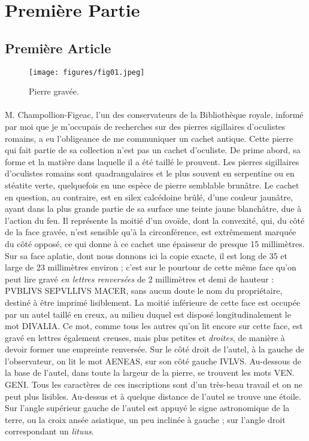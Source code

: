 \documentclass[a4paper, 11pt, oneside, polutonikogreek, french]{article}
\begin{document}
\section{Première Partie}
\subsection{Première Article}
\begin{figure}[H]
\centering
\texttt{[image: figures/fig01.jpeg]}
\caption{Pierre gravée.}
\end{figure}
\paragraph{}
M. Champollion-Figeac, l'un des conservateurs de la Bibliothèque royale, informé par moi que je m'occupais de recherches sur des pierres sigillaires d'oculistes romains, a eu l'obligeance de me communiquer un cachet antique. Cette pierre qui fait partie de sa collection n'est pas un cachet d'oculiste. De prime abord, sa forme et la matière dans laquelle il a été taillé le prouvent. Les pierres sigillaires d'oculistes romains sont quadrangulaires et le plus souvent en serpentine ou en stéatite verte, quelquefois en une espèce de pierre semblable brunâtre. Le cachet en question, au contraire, est en silex calcédoine brûlé, d'une couleur jaunâtre, ayant dans la plus grande partie de sa surface une teinte jaune blanchâtre, due à l'action du feu. Il représente la moitié d'un ovoïde, dont la convexité, qui, du côté de la face gravée, n'est sensible qu'à la circonférence, est extrêmement marquée du côté opposé, ce qui donne à ce cachet une épaisseur de presque 15 millimètres. Sur sa face aplatie, dont nous donnons ici la copie exacte, il est long de 35 et large de 23 millimètres environ ; c'est sur le pourtour de cette même face qu'on peut lire gravé \emph{en lettres renversées} de 2 millimètres et demi de hauteur : PVBLIVS SEPVLLIVS MACER, sans aucun doute le nom du propriétaire, destiné à être imprimé lisiblement. La moitié inférieure de cette face est occupée par un autel taillé en creux, au milieu duquel est disposé longitudinalement le mot DIVALIA. Ce mot, comme tous les autres qu'on lit encore sur cette face, est gravé en lettres également creuses, mais plus petites et \emph{droites}, de manière à devoir former une empreinte renversée. Sur le côté droit de l'autel, à la gauche de l'observateur, on lit le mot AENEAS, sur son côté gauche IVLVS. Au-dessous de la base de l'autel, dans toute la largeur de la pierre, se trouvent les mots VEN. GENI. Tous les caractères de ces inscriptions sont d'un très-beau travail et on ne peut plus lisibles. Au-dessus et à quelque distance de l'autel se trouve une étoile. Sur l'angle supérieur gauche de l'autel est appuyé le signe astronomique de la terre, ou la croix ansée asiatique, un peu inclinée à gauche ; sur l'angle droit correspondant un \emph{lituus}.
\end{document}
